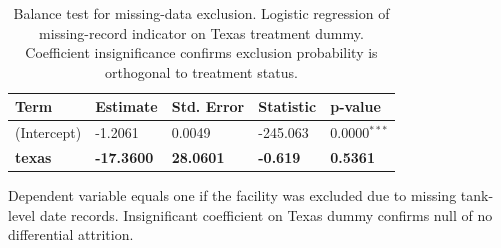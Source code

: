 \begin{table}[!h]
\centering
\caption{\label{tab:tab:missing-balance}Balance test for missing-data exclusion. Logistic regression of missing-record indicator on Texas treatment dummy. Coefficient insignificance confirms exclusion probability is orthogonal to treatment status.}
\centering
\fontsize{10}{12}\selectfont
\begin{threeparttable}
\begin{tabular}[t]{lllll}
\toprule
Term & Estimate & Std. Error & Statistic & p-value\\
\midrule
(Intercept) & -1.2061 & 0.0049 & -245.063 & 0.0000$^{***}$\\
\textbf{texas} & \textbf{-17.3600} & \textbf{28.0601} & \textbf{-0.619} & \textbf{0.5361}\\
\bottomrule
\end{tabular}
\begin{tablenotes}
\item Dependent variable equals one if the facility was excluded due to missing tank-level date records. Insignificant coefficient on Texas dummy confirms null of no differential attrition.
\end{tablenotes}
\end{threeparttable}
\end{table}
